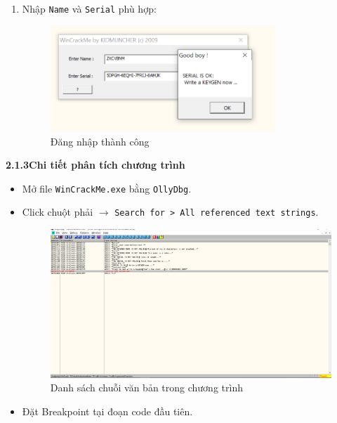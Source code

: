 \begin{itemize}
\begin{enumerate}[label=\textbf{TH\arabic*:}]
        \item Nhập \texttt{Name} và \texttt{Serial} phù hợp:
        \begin{figure}[H]
            \centering
            \includegraphics[width=0.8\textwidth]{img/file-2/demo8.PNG}
            \caption{Đăng nhập thành công}
        \end{figure}
    \end{enumerate}
\end{itemize}

\newpage
\noindent\textbf{2.1.3\quad Chi tiết phân tích chương trình}

\begin{itemize}
    \item Mở file \texttt{WinCrackMe.exe} bằng \texttt{OllyDbg}.
    \item Click chuột phải $\rightarrow$ \texttt{Search for > All referenced text strings}.
    \begin{figure}[H]
        \centering
        \includegraphics[width=\textwidth]{img/file-2/asm2.PNG}
        \caption{Danh sách chuỗi văn bản trong chương trình}
    \end{figure}
    
    \item Đặt Breakpoint tại đoạn code đầu tiên.
\end{itemize}

